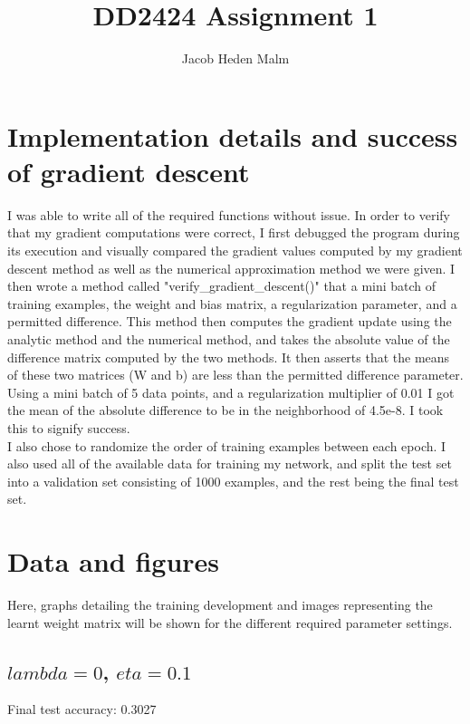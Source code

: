 \documentclass[11pt,a4paper]{article}
\author{Jacob Heden Malm}
\title{DD2424 Assignment 1}
\begin{document}
\maketitle

\section{Implementation details and success of gradient descent}

I was able to write all of the required functions without issue. In order to verify that my gradient computations were correct, I first debugged the program during its execution and visually compared the gradient values computed by my gradient descent method as well as the numerical approximation method we were given. I then wrote a method called "verify\_gradient\_descent()" that a mini batch of training examples, the weight and bias matrix, a regularization parameter, and a permitted difference. This method then computes the gradient update using the analytic method and the numerical method, and takes the absolute value of the difference matrix computed by the two methods. It then asserts that the means of these two matrices (W and b) are less than the permitted difference parameter. Using a mini batch of 5 data points, and a regularization multiplier of 0.01 I got the mean of the absolute difference to be in the neighborhood of 4.5e-8. I took this to signify success.\\

I also chose to randomize the order of training examples between each epoch. I also used all of the available data for training my network, and split the test set into a validation set consisting of 1000 examples, and the rest being the final test set.

\section{Data and figures}
Here, graphs detailing the training development and images representing the learnt weight matrix will be shown for the different required parameter settings.

\subsection{$lambda=0$, $eta=0.1$}
Final test accuracy: 0.3027
\end{document}

